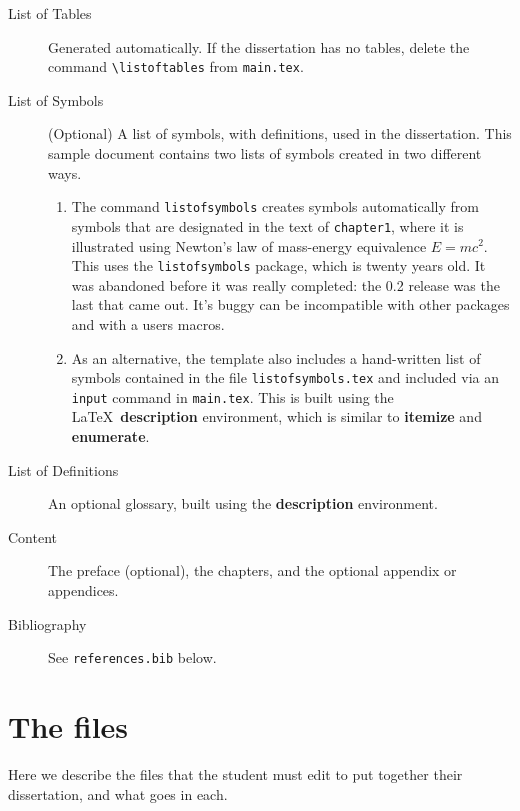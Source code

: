 \begin{description}
\item [List of Tables] Generated automatically. If the dissertation has no tables, delete the command \verb+\listoftables+ from \texttt{main.tex}.
%
\item [List of Symbols] (Optional) A list of symbols, with definitions, used in the dissertation. This sample document contains two lists of symbols created in two different ways. 
\begin{enumerate}
\item The command \texttt{listofsymbols} creates symbols automatically from symbols that are designated in the text of \texttt{chapter1}, where it is illustrated using Newton's law of mass-energy equivalence $E=m c^2$. This uses the \texttt{listofsymbols} package, which is twenty years old. It was abandoned before it was really completed: the 0.2 release was the last that came out. It's buggy can be incompatible with other packages and with a users macros.
\item As an alternative, the template also includes a hand-written list of symbols contained in the file \texttt{listofsymbols.tex} and included via an \texttt{input} command in \texttt{main.tex}. This is built using the \LaTeX\ \textbf{description} environment, which is similar to \textbf{itemize} and \textbf{enumerate}.
\end{enumerate}
%
\item [List of Definitions] An optional glossary, built using the \textbf{description} environment.
%
\item [Content] The preface (optional), the chapters, and the optional appendix or appendices.
%
\item [Bibliography] See \texttt{references.bib} below.
\end{description}


\section*{The files}

Here we describe the files that the student must edit to put together their dissertation, and what goes in each.

